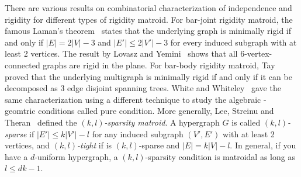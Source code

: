 There are various results on combinatorial characterization of independence and rigidity
for different types of  rigidity matroid. 
For bar-joint rigidity matroid, 
the famous Laman's theorem~\cite{???} states that the underlying graph
is minimally rigid if and only if $|E| = 2|V|-3$ and $|E'| \le 2|V'|-3$ for every induced subgraph with at least 2 vertices. 
The result by Lovasz and Yemini~\cite{???} shows that all 6-vertex-connected graphs are rigid in the plane. 
For bar-body rigidity matroid,
Tay~\cite{???} proved that
the underlying multigraph is minimally rigid if and only if it can be decomposed as $3$ edge disjoint spanning trees. 
White and Whiteley~\cite{???} gave the same characterization using a different technique to study the algebraic - geomtric conditions called pure condition.
More generally, 
Lee, Streinu and Theran~\cite{???} defined the {\em $(k,l)$-sparsity matroid}.
A hypergraph $G$ is called {\em $(k,l)$-sparse} if $|E'| \le k|V'| - l$ for any induced subgraph $(V',E')$ with at least 2 vertices, 
and {\em $(k,l)$-tight} if is $(k,l)$-sparse and $|E| = k|V| - l$. 
In general, if you have a $d$-uniform hypergraph, a $(k,l)$-sparsity
condition is matroidal as long as $l \le dk-1$. 






